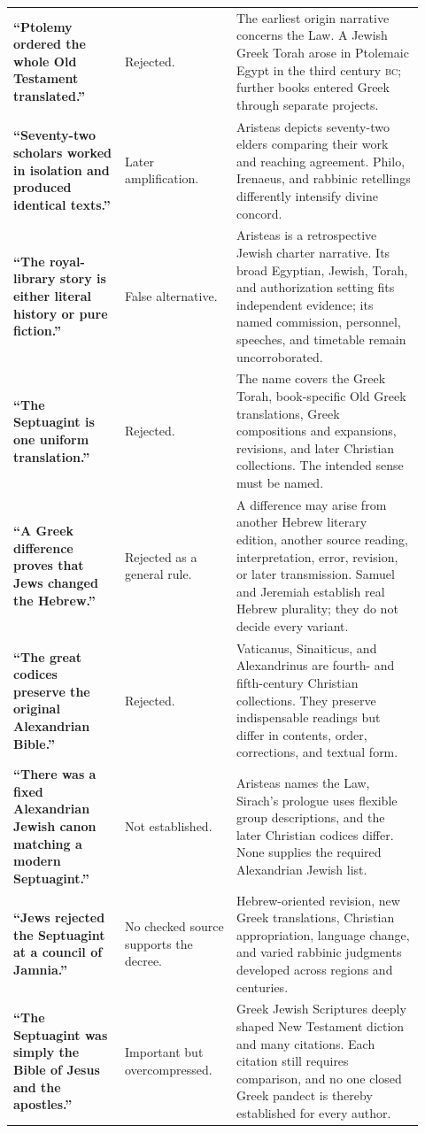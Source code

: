 \begin{longtable}{>{\bfseries\RaggedRight\arraybackslash}p{0.25\linewidth}>{\RaggedRight\arraybackslash}p{0.25\linewidth}>{\RaggedRight\arraybackslash}p{0.42\linewidth}}
“Ptolemy ordered the whole Old Testament translated.” & Rejected. & The earliest origin narrative concerns the Law. A Jewish Greek Torah arose in Ptolemaic Egypt in the third century \textsc{bc}; further books entered Greek through separate projects.\\
“Seventy-two scholars worked in isolation and produced identical texts.” & Later amplification. & Aristeas depicts seventy-two elders comparing their work and reaching agreement. Philo, Irenaeus, and rabbinic retellings differently intensify divine concord.\\
“The royal-library story is either literal history or pure fiction.” & False alternative. & Aristeas is a retrospective Jewish charter narrative. Its broad Egyptian, Jewish, Torah, and authorization setting fits independent evidence; its named commission, personnel, speeches, and timetable remain uncorroborated.\\
“The Septuagint is one uniform translation.” & Rejected. & The name covers the Greek Torah, book-specific Old Greek translations, Greek compositions and expansions, revisions, and later Christian collections. The intended sense must be named.\\
“A Greek difference proves that Jews changed the Hebrew.” & Rejected as a general rule. & A difference may arise from another Hebrew literary edition, another source reading, interpretation, error, revision, or later transmission. Samuel and Jeremiah establish real Hebrew plurality; they do not decide every variant.\\
“The great codices preserve the original Alexandrian Bible.” & Rejected. & Vaticanus, Sinaiticus, and Alexandrinus are fourth- and fifth-century Christian collections. They preserve indispensable readings but differ in contents, order, corrections, and textual form.\\
“There was a fixed Alexandrian Jewish canon matching a modern Septuagint.” & Not established. & Aristeas names the Law, Sirach's prologue uses flexible group descriptions, and the later Christian codices differ. None supplies the required Alexandrian Jewish list.\\
“Jews rejected the Septuagint at a council of Jamnia.” & No checked source supports the decree. & Hebrew-oriented revision, new Greek translations, Christian appropriation, language change, and varied rabbinic judgments developed across regions and centuries.\\
“The Septuagint was simply the Bible of Jesus and the apostles.” & Important but overcompressed. & Greek Jewish Scriptures deeply shaped New Testament diction and many citations. Each citation still requires comparison, and no one closed Greek pandect is thereby established for every author.\\

\end{longtable}
